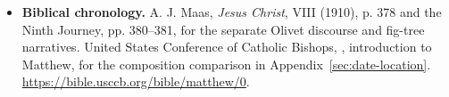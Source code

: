 \begin{itemize}
\item \textbf{Biblical chronology.}
A. J. Maas, \textit{Jesus Christ}, 
VIII (1910), p. 378 and the Ninth Journey, pp. 380--381, for
the separate Olivet discourse and fig-tree narratives.
United States Conference of Catholic Bishops,
, introduction to Matthew,
for the composition comparison in Appendix~\ref{sec:date-location}.
\url{https://bible.usccb.org/bible/matthew/0}.
\end{itemize}
